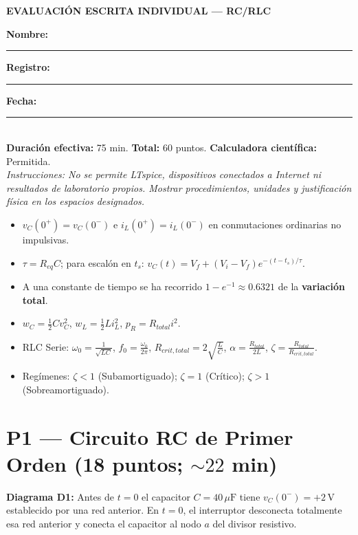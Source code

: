 \documentclass[11pt, a4paper]{article}
\begin{document}
\begin{center}
    \textbf{\Large EVALUACIÓN ESCRITA INDIVIDUAL — RC/RLC}
\end{center}
\vspace{0.2cm}
\textbf{Nombre:} \rule{6cm}{0.4pt} \quad \textbf{Registro:} \rule{3cm}{0.4pt} \quad \textbf{Fecha:} \rule{2.5cm}{0.4pt} \\
\textbf{Duración efectiva:} 75 min. \quad \textbf{Total:} 60 puntos. \quad \textbf{Calculadora científica:} Permitida. \\
\textit{Instrucciones: No se permite LTspice, dispositivos conectados a Internet ni resultados de laboratorio propios. Mostrar procedimientos, unidades y justificación física en los espacios designados.}

\vspace{0.3cm}
\begin{tcolorbox}[colback=white, colframe=black, boxsep=1pt, title=\textbf{Formulario Común Autorizado}]
\small
\begin{itemize}\setlength\itemsep{0.1cm}
    \item $v_C(0^+) = v_C(0^-)$ e $i_L(0^+) = i_L(0^-)$ en conmutaciones ordinarias no impulsivas.
    \item $\tau = R_{eq} C$; para escalón en $t_s$: $v_C(t) = V_f + (V_i - V_f)e^{-(t-t_s)/\tau}$.
    \item A una constante de tiempo se ha recorrido $1 - e^{-1} \approx 0.6321$ de la \textbf{variación total}.
    \item $w_C = \frac{1}{2} C v_C^2$, \quad $w_L = \frac{1}{2} L i_L^2$, \quad $p_R = R_{total} i^2$.
    \item RLC Serie: $\omega_0 = \frac{1}{\sqrt{LC}}$, \quad $f_0 = \frac{\omega_0}{2\pi}$, \quad $R_{crit,total} = 2\sqrt{\frac{L}{C}}$, \quad $\alpha = \frac{R_{total}}{2L}$, \quad $\zeta = \frac{R_{total}}{R_{crit,total}}$.
    \item Regímenes: $\zeta < 1$ (Subamortiguado); $\zeta = 1$ (Crítico); $\zeta > 1$ (Sobreamortiguado).
\end{itemize}
\end{tcolorbox}

\vspace{0.2cm}
\section*{P1 — Circuito RC de Primer Orden (18 puntos; $\sim 22$ min)}

\noindent\textbf{Diagrama D1:} Antes de $t=0$ el capacitor $C=40\,\mu\text{F}$ tiene $v_C(0^-) = +2\,\text{V}$ establecido por una red anterior. En $t=0$, el interruptor desconecta totalmente esa red anterior y conecta el capacitor al nodo $a$ del divisor resistivo.
\end{document}
